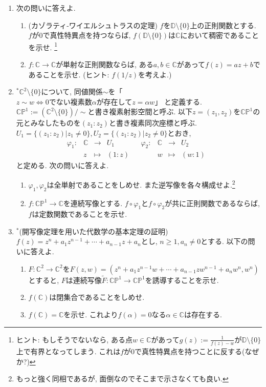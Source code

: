 \documentclass[dvipdfmx,a4paper,11pt]{article}
\newcommand{\C}{\mathbb{C}}
\newcommand{\D}{\mathbb{D}}
\theoremstyle{definition}
\begin{document}
\begin{enumerate}[label=\textbf{問}6.\arabic*]
     
     \newpage
   \item 次の問いに答えよ.
     \begin{enumerate}
\setlength{\parskip}{0cm} 
  \setlength{\itemsep}{0cm} 
 \item (カゾラティ-ワイエルシュトラスの定理) $f$を$\D \setminus \{ 0\}$上の正則関数とする. $f$が$0$で真性特異点を持つならば, $f(\D \setminus \{ 0\})$は$\C$において稠密であることを示せ. \footnote{ヒント: もしそうでないなら, ある点$w \in \C $があって$g(z):=\frac{1}{f(z) - w}$が$\D \setminus \{ 0\}$上で有界となってしまう. これは$f$が$0$で真性特異点を持つことに反する(なぜか?)}
\item  $f : \C \rightarrow \C$が単射な正則関数ならば, ある$a,b \in\C$があって$f(z) =az +b$であることを示せ. (ヒント: $f(1/z)$を考えよ.)
       \end{enumerate}  
\item $^{*}$$\C^{2} \setminus \{ 0\}$について, 同値関係$\sim$を「
	$
	z \sim w \Leftrightarrow \text{0でない複素数$\alpha$が存在して$z = \alpha w$}
	$」
	と定義する. $ \C\mathbb{P}^{1}:= (\C^{2} \setminus \{ 0\})/\sim$と書き複素射影空間と呼ぶ. 以下$z = (z_{1}, z_{2})$を$\C\mathbb{P}^{1}$の元とみなしたものを$(z_{1}:z_{2})$と書き複素同次座標と呼ぶ.
$U_{1} = \{ (z_{1}:z_{2}) | z_{1}\neq 0\}, U_{2} = \{ (z_{1}:z_{2}) | z_{2}\neq 0\}$とおき, 
$$
\begin{array}{cccccccccc}
\varphi_{1}: &\C& \rightarrow & U_{1}& &\varphi_{2}: &\C& \rightarrow & U_{2}& \\
                      &z &\longmapsto &(1:z)&      &                      &w& \longmapsto &(w:1)&
\end{array}
$$	
と定める. 次の問いに答えよ.
  \begin{enumerate}
\setlength{\parskip}{0cm} 
  \setlength{\itemsep}{0cm} 
  \item $\varphi_1, \varphi_2$は全単射であることをしめせ.  また逆写像を各々構成せよ.\footnote{もっと強く同相であるが, 面倒なのでそこまで示さなくても良い.}
  \item $f : \C\mathbb{P}^{1} \rightarrow  \C$を連続写像とする. $f \circ \varphi_{1}$と$f \circ \varphi_{2}$が共に正則関数であるならば, $f$は定数関数であることを示せ. 
     \end{enumerate}  
     
 \item $^{*}$(開写像定理を用いた代数学の基本定理の証明) $f(z) = z^n + a_1 z^{n-1}+ \cdots + a_{n-1}z + a_n$とし, $n \ge 1, a_n \neq 0$とする.  以下の問いに答えよ.
   \begin{enumerate}
\setlength{\parskip}{0cm} 
  \setlength{\itemsep}{0cm} 
\item $F : \C^2 \rightarrow \C^2$を$F(z,w) = (z^n + a_1 z^{n-1}w+ \cdots +a_{n-1}zw^{n-1} + a_n w^n, w^n )$とすると, $F$は連続写像$\tilde{F} : \C\mathbb{P}^{1} \to \C\mathbb{P}^{1} $を誘導することを示せ. 
\item $f(\C)$は閉集合であることをしめせ.
\item $f(\C)=\C$を示せ. これより$f(\alpha)=0$なる$\alpha \in \C$は存在する.
      \end{enumerate}  


\end{enumerate}
\end{document}
